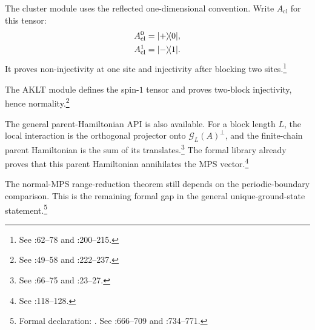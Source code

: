 \documentclass{article}
\begin{document}
The cluster module uses the reflected one-dimensional convention. Write
$A_{\mathrm{cl}}$ for this tensor:
\begin{align}
    A_{\mathrm{cl}}^0
        &=
        |+\rangle\!\langle 0|,
    \label{eq:rmp_example_parent_hamiltonian_scope_formal_cluster_zero}\\
    A_{\mathrm{cl}}^1
        &=
        |-\rangle\!\langle 1|.
    \label{eq:rmp_example_parent_hamiltonian_scope_formal_cluster_one}
\end{align}
It proves non-injectivity at one site and injectivity after blocking two
sites.\footnote{See :62--78 and
:200--215.}

The AKLT module defines the spin-$1$ tensor and proves two-block injectivity,
hence normality.\footnote{See :49--58 and
:222--237.}

The general parent-Hamiltonian API is also available. For a block length $L$,
the local interaction is the orthogonal projector onto
$\mathcal G_L(A)^\perp$, and the finite-chain parent Hamiltonian is the sum of
its translates.\footnote{See
:66--75 and
:23--27.}
The formal library already proves that this parent Hamiltonian annihilates the
MPS vector.\footnote{See
:118--128.}

The normal-MPS range-reduction theorem still depends on the periodic-boundary
comparison. This is the remaining formal gap in the general unique-ground-state
statement.\footnote{Formal declaration:
. See
:666--709 and
:734--771.}
\end{document}
